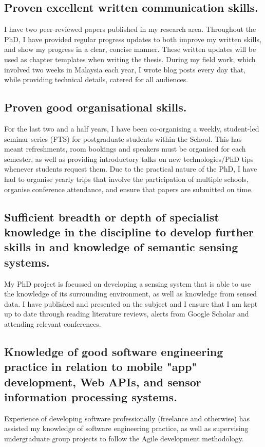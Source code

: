 \documentclass[10pt,a4paper]{article}
\begin{document}
\subsection{Proven excellent written communication skills.}
I have two peer-reviewed papers published in my research area. Throughout the PhD, I have provided regular progress updates to both improve my written skills, and show my progress in a clear, concise manner. These written updates will be used as chapter templates when writing the thesis. During my field work, which involved two weeks in Malaysia each year, I wrote blog posts every day that, while providing technical details, catered for all audiences.

\subsection{Proven good organisational skills.}
For the last two and a half years, I have been co-organising a weekly, student-led seminar series (FTS) for postgraduate students within the School. This has meant refreshments, room bookings and speakers must be organised for each semester, as well as providing introductory talks on new technologies/PhD tips whenever students request them. Due to the practical nature of the PhD, I have had to organise yearly trips that involve the participation of multiple schools, organise conference attendance, and ensure that papers are submitted on time.

\subsection{Sufficient breadth or depth of specialist knowledge in the discipline to develop further skills in and knowledge of semantic sensing systems.}
My PhD project is focussed on developing a sensing system that is able to use the knowledge of its surrounding environment, as well as knowledge from sensed data. I have published and presented on the subject and I ensure that I am kept up to date through reading literature reviews, alerts from Google Scholar and attending relevant conferences.

\subsection{Knowledge of good software engineering practice in relation to mobile "app" development, Web APIs, and sensor information processing systems.}
Experience of developing software professionally (freelance and otherwise) has assisted my knowledge of software engineering practice, as well as supervising undergraduate group projects to follow the Agile development methodology. 
\end{document}
